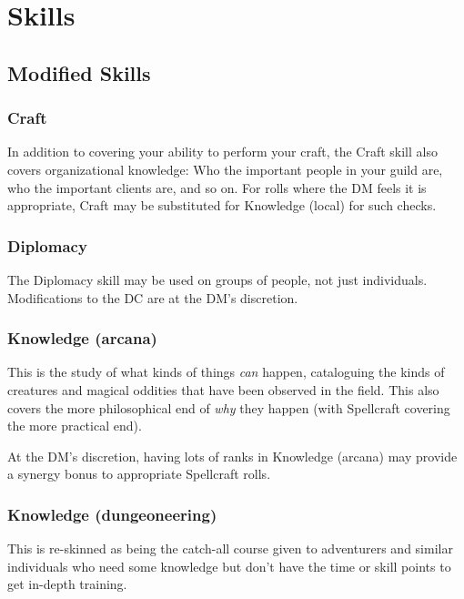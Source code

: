 
\chapter{Skills}
\label{sect-skills}

\section{Modified Skills}

%
\subsection{Craft}

In addition to covering your ability to perform your craft, the Craft skill
also covers organizational knowledge: Who the important people in your guild
are, who the important clients are, and so on. For rolls where the DM feels
it is appropriate, Craft may be substituted for Knowledge (local) for such
checks.
%

%
\subsection{Diplomacy}

The Diplomacy skill may be used on groups of people, not just individuals.
Modifications to the DC are at the DM's discretion.
%

%
\subsection{Knowledge (arcana)}

This is the study of what kinds of things \textit{can} happen, cataloguing
the kinds of creatures and magical oddities that have been observed in the
field. This also covers the more philosophical end of \textit{why} they
happen (with Spellcraft covering the more practical end).

At the DM's discretion, having lots of ranks in Knowledge (arcana) may
provide a synergy bonus to appropriate Spellcraft rolls.
%

%
\subsection{Knowledge (dungeoneering)}

This is re-skinned as being the catch-all course given to adventurers and
similar individuals who need some knowledge but don't have the time or
skill points to get in-depth training.

